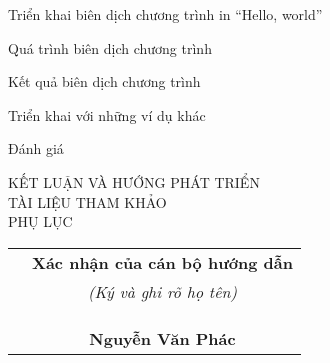 \documentclass[11pt,a4paper]{article}
\begin{document}
\begin{mucluc}
        \begin{mucluc}
            \item Triển khai biên dịch chương trình in “Hello, world”
            \begin{mucluc}
                \item Quá trình biên dịch chương trình 
                \item Kết quả biên dịch chương trình
            \end{mucluc}
            \item Triển khai với những ví dụ khác
            \item Đánh giá
        \end{mucluc}
    \end{mucluc}

    \noindent 
    \vspace{5pt}KẾT LUẬN VÀ HƯỚNG PHÁT TRIỂN\\\vspace{5pt}TÀI LIỆU THAM KHẢO\\PHỤ LỤC
    
    \vspace{1cm}
    \fontsize{12}{0} 
    \begin{tabular}{ m{8cm} c }
        & \textbf{Xác nhận của cán bộ hướng dẫn}\\
        & \textit{(Ký và ghi rõ họ tên)}\\
        &\\ &\\ &\\ 
        & \textbf{Nguyễn Văn Phác}
    \end{tabular}
\end{document}
